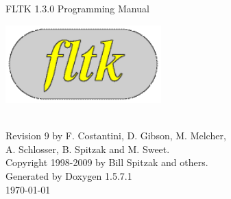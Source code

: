 \documentclass[a4paper]{book}
\begin{document}
\begin{titlepage}
\vspace*{4.5cm}
\begin{center}
{\Huge FLTK 1.3.0 Programming Manual}\\
\vspace*{2cm}
\begin{ImageNoCaption}
 \mbox{\includegraphics[width=6cm]{FL200}}
\end{ImageNoCaption}\\
\vspace*{2cm}
{\Large
Revision 9 by F. Costantini, D. Gibson, M. Melcher, \\
A. Schlosser, B. Spitzak and M. Sweet.}\\
\vspace*{1.5cm}
{\large Copyright 1998-2009 by Bill Spitzak and others.}\\
\vspace*{3.5cm}
{\large Generated by Doxygen 1.5.7.1}\\
\vspace*{0.5cm}
\today{}\\
\end{center}
\end{titlepage}
\clearemptydoublepage
{}
\tableofcontents
\clearemptydoublepage
{}
\end{document}

